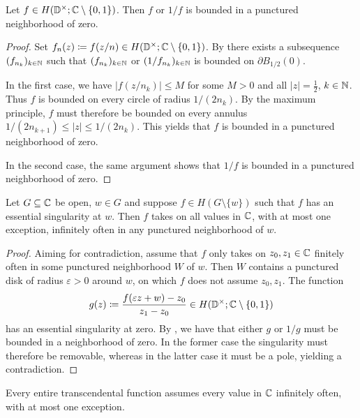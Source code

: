 \begin{lemma} \label{lem:great-picard-bounded}
    Let $f \in H(\mathbb{D}^\times; \mathbb{C} \setminus \{ 0, 1 \})$. Then $f$ or $1/f$ is bounded in a punctured neighborhood of zero.
\end{lemma}

\begin{proof}
    Set $f_n(z) \coloneqq f(z / n) \in H(\mathbb{D}^\times; \mathbb{C} \setminus \{ 0, 1 \})$. By  there exists a subsequence $(f_{n_k})_{k \in \mathbb{N}}$ such that $(f_{n_k})_{k \in \mathbb{N}}$ or $(1 / f_{n_k})_{k \in \mathbb{N}}$ is bounded on $\partial B_{1/2}(0)$.

    In the first case, we have $\vert f(z / n_k) \vert \leq M$ for some $M > 0$ and all $\vert z \vert = \frac{1}{2}$, $k \in \mathbb{N}$. Thus $f$ is bounded on every circle of radius $1 / (2 n_k)$. By the maximum principle, $f$ must therefore be bounded on every annulus $1 / (2 n_{k + 1}) \leq \vert z \vert \leq 1 / (2 n_k)$. This yields that $f$ is bounded in a punctured neighborhood of zero.

    In the second case, the same argument shows that $1 / f$ is bounded in a punctured neighborhood of zero.
\end{proof}

\begin{theorem} \label{thm:picards-great-theorem}
    Let $G \subseteq \mathbb{C}$ be open, $w \in G$ and suppose $f \in H(G \setminus \{ w \})$ such that $f$ has an essential singularity at $w$. Then $f$ takes on all values in $\mathbb{C}$, with at most one exception, infinitely often in any punctured neighborhood of $w$.
\end{theorem}

\begin{proof}
    Aiming for contradiction, assume that $f$ only takes on $z_0, z_1 \in \mathbb{C}$ finitely often in some punctured neighborhood $W$ of $w$. Then $W$ contains a punctured disk of radius $\varepsilon > 0$ around $w$, on which $f$ does not assume $z_0, z_1$. The function
    $$ g(z) \coloneqq \frac{f(\varepsilon z + w) - z_0}{z_1 - z_0} \in H(\mathbb{D}^\times; \mathbb{C} \setminus \{ 0, 1 \}) $$
    has an essential singularity at zero. By , we have that either $g$ or $1/g$ must be bounded in a neighborhood of zero. In the former case the singularity must therefore be removable, whereas in the latter case it must be a pole, yielding a contradiction.
\end{proof}

\begin{corollary} \label{cor:transcendental-every-value-inf}
    Every entire transcendental function assumes every value in $\mathbb{C}$ infinitely often, with at most one exception.
\end{corollary}

